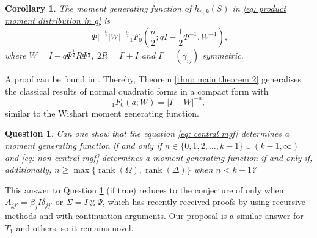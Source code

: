 \documentclass{amsart}
\newtheorem{corollary}[theorem]{Corollary}
\newtheorem{question}[theorem]{Question}
\theoremstyle{definition}
\numberwithin{equation}{section}
\begin{document}





\begin{corollary}\label{lem: mgf} The moment generating function of $h_{n,k}( S)$ in \eqref{eq: product moment distribution in q} is
    \[| \varPhi|^{-\frac{k}{2}} | W|^{-\frac{n}{2}} {_{1}}F_{0} \left(\frac{n}{2};q I - \frac{1}{2} \varPhi^{-1},  W^{-1}\right),\]
     where $ W =  I - q  \varPsi^{\frac{1}{2}}  R \varPsi^{\frac{1}{2}}$, $2 R =  \varGamma +  I$ and $ \varGamma = (\gamma_{ij})$ symmetric. 
\end{corollary}%
A proof can be found in \cite{khatri1966}. Thereby, Theorem \ref{thm: main theorem 2} generalises the classical results of normal quadratic forms in a compact form with $${}_1F_{0}\left(a;W\right) = |I - W|^{-a},$$
similar to the Wishart moment generating function.
\begin{question}\label{ques: mgf} 
    Can one show that the equation \eqref{eq: central mgf} determines a moment generating function if and only if $n\in\{0,1,2,\dots,k-1\}\cup (k-1,\infty)$ and \eqref{eq: non-central mgf} determines a moment generating function if and only if, additionally, $n \geq \max\{\operatorname{rank}(\varOmega),\operatorname{rank}(\varDelta)\}$ when $n < k-1$? 
\end{question}

This answer to Question \ref{ques: mgf} (if true) reduces to the conjecture of \cite{peddada1991} only when $A_{jj'} = \beta_{j}I\delta_{jj'}$ or $\varSigma = I \otimes \varPsi$, which has recently received proofs by \cite{letac2018laplace} using recursive methods and \cite{mayerhofer2019wishart} with continuation arguments. Our proposal is a similar answer for $T_1$ and others, so it remains novel.
\end{document}
